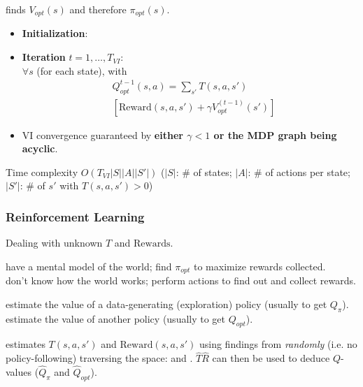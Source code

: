  finds $V_{opt}(s)$ and therefore $\pi_{opt}(s)$.
\begin{itemize}
    \item \textbf{Initialization}: 
    \item \textbf{Iteration} $t = 1,\dots,T_{VI}$:\\
        $\forall s$ (for each state), 
        with \begin{displaymath}
            \boxed{
                \begin{aligned}
                    &Q_{opt}^{t-1}(s,a) = \sum_{s'}T(s,a,s')\\
                    &\left[\text{Reward}(s,a,s') + \gamma V_{opt}^{(t-1)}(s')\right]
                \end{aligned}
            }
        \end{displaymath}
    \item VI convergence guaranteed by
        \textbf{either $\gamma < 1$ or the MDP graph being acyclic}.
\end{itemize}
Time complexity $O(T_{VI}|S||A||S'|)$ ($|S|$: \# of states; $|A|$: \# of
actions per state; $|S'|$: \# of $s'$ with $T(s,a,s') > 0$)

\subsubsection{Reinforcement Learning}

Dealing with unknown $T$ and $\text{Rewards}$.

 have a mental model of the world; find
$\pi_{opt}$ to maximize rewards collected.\\
 don't know how the world works;
perform actions to find out and collect rewards.

 estimate the value of a data-generating (exploration)
policy (usually to get $Q_{\pi}$).\\
 estimate the value of another policy (usually to get
$Q_{opt}$).

 estimates $T(s,a,s')$ and
$\text{Reward}(s,a,s')$ using findings from \emph{randomly} (i.e. no
policy-following) traversing the space:
and .
$\hat{T} \hat{R}$ can then be used to deduce $Q$-values ($\hat{Q}_\pi$ and
$\hat{Q}_{opt}$).

